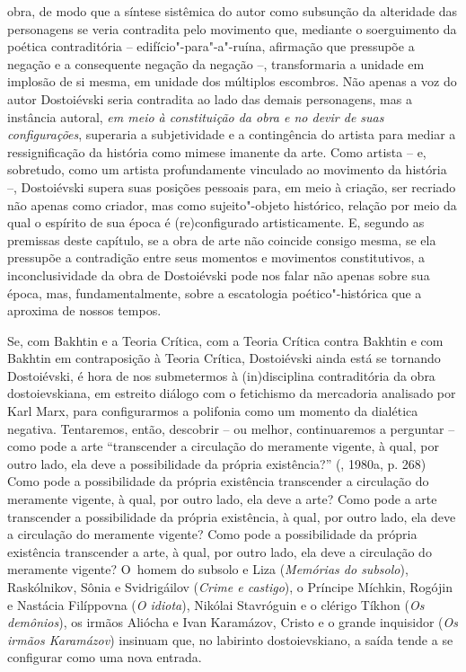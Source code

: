 {{obra, de modo que a síntese sistêmica do autor como subsunção da
alteridade das personagens se veria contradita pelo movimento que,
mediante o soerguimento da poética contraditória --
edifício"-para"-a"-ruína, afirmação que pressupõe a negação e a consequente
negação da negação --, transformaria a unidade em implosão de si mesma,
em unidade dos múltiplos escombros. Não apenas a voz do autor
Dostoiévski seria contradita ao lado das demais personagens, mas a
instância autoral, \emph{em meio à constituição da obra e no devir de
suas configurações}, superaria a subjetividade e a contingência do
artista para mediar a ressignificação da história como mimese imanente
da arte. Como artista -- e, sobretudo, como um artista profundamente
vinculado ao movimento da história --, Dostoiévski supera suas posições
pessoais para, em meio à criação, ser recriado não apenas como criador,
mas como sujeito"-objeto histórico, relação por meio da qual o espírito
de sua época é (re)configurado artisticamente. E, segundo as premissas
deste capítulo, se a obra de arte não coincide consigo mesma, se ela
pressupõe a contradição entre seus momentos e movimentos constitutivos,
a inconclusividade da obra de Dostoiévski pode nos falar não apenas
sobre sua época, mas, fundamentalmente, sobre a escatologia
poético"-histórica que a aproxima de nossos tempos.

Se, com Bakhtin e a Teoria Crítica, com a Teoria Crítica contra Bakhtin
e com Bakhtin em contraposição à Teoria Crítica, Dostoiévski ainda está
se tornando Dostoiévski, é hora de nos submetermos à (in)disciplina
contraditória da obra dostoievskiana, em estreito diálogo com o
fetichismo da mercadoria analisado por Karl Marx, para configurarmos a
polifonia como um momento da dialética negativa. Tentaremos, então,
descobrir -- ou melhor, continuaremos a perguntar -- como pode a arte
``transcender a circulação do meramente vigente, à qual, por outro lado,
ela deve a possibilidade da própria existência?'' (, 1980a, p.
268) Como pode a possibilidade da própria existência transcender a
circulação do meramente vigente, à qual, por outro lado, ela deve a
arte? Como pode a arte transcender a possibilidade da própria
existência, à qual, por outro lado, ela deve a circulação do meramente
vigente? Como pode a possibilidade da própria existência transcender a
arte, à qual, por outro lado, ela deve a circulação do meramente
vigente? O~homem do subsolo e Liza (\emph{Memórias do subsolo}),
Raskólnikov, Sônia e Svidrigáilov (\emph{Crime e castigo}), o Príncipe
Míchkin, Rogójin e Nastácia Filíppovna (\emph{O idiota}), Nikólai
Stavróguin e o clérigo Tíkhon (\emph{Os demônios}), os irmãos Aliócha e
Ivan Karamázov, Cristo e o grande inquisidor (\emph{Os irmãos
Karamázov}) insinuam que, no labirinto dostoievskiano, a saída tende a
se configurar como uma nova entrada.

}}
